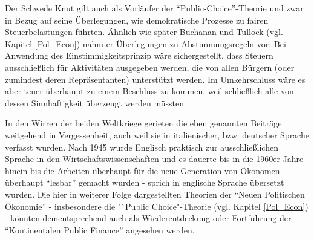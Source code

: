Der Schwede Knut \textcite{Wicksell1896} gilt auch als Vorläufer der "`Public-Choice"'-Theorie und zwar in Bezug auf seine Überlegungen, wie demokratische Prozesse zu fairen Steuerbelastungen führten. Ähnlich wie später Buchanan und Tullock (vgl. Kapitel \ref{Pol_Econ}) nahm er Überlegungen zu Abstimmungsregeln vor: Bei Anwendung des Einstimmigkeitsprinzip wäre sichergestellt, dass Steuern ausschließlich für Aktivitäten ausgegeben werden, die von allen Bürgern (oder zumindest deren Repräsentanten) unterstützt werden. Im Umkehrschluss wäre es aber teuer überhaupt zu einem Beschluss zu kommen, weil schließlich alle von dessen Sinnhaftigkeit überzeugt werden müssten \parencite[S. 20]{Backhaus2005}.
	
In den Wirren der beiden Weltkriege gerieten die eben genannten Beiträge weitgehend in Vergessenheit, auch weil sie in italienischer, bzw. deutscher Sprache verfasst wurden. Nach 1945 wurde Englisch praktisch zur ausschließlichen Sprache in den Wirtschaftswissenschaften und es dauerte bis in die 1960er Jahre hinein bis die Arbeiten überhaupt für die neue Generation von Ökonomen überhaupt "`lesbar"' gemacht wurden - sprich in englische Sprache übersetzt wurden. Die hier in weiterer Folge dargestellten Theorien der "`Neuen Politischen Ökonomie"' - insbesondere die "`Public Choice"-Theorie (vgl. Kapitel \ref{Pol_Econ}) - könnten dementsprechend auch als Wiederentdeckung oder Fortführung der "`Kontinentalen Public Finance"' angesehen werden.

